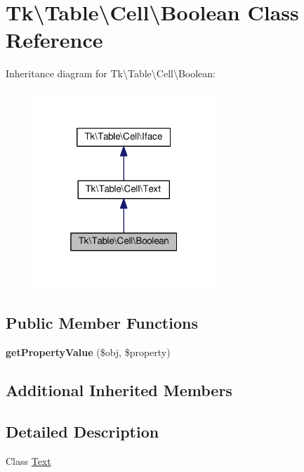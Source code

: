\hypertarget{classTk_1_1Table_1_1Cell_1_1Boolean}{\section{Tk\textbackslash{}Table\textbackslash{}Cell\textbackslash{}Boolean Class Reference}
\label{classTk_1_1Table_1_1Cell_1_1Boolean}
}


Inheritance diagram for Tk\textbackslash{}Table\textbackslash{}Cell\textbackslash{}Boolean\+:\nopagebreak
\begin{figure}[H]
\begin{center}
\leavevmode
\includegraphics[width=193pt]{classTk_1_1Table_1_1Cell_1_1Boolean__inherit__graph}
\end{center}
\end{figure}
\subsection*{Public Member Functions}
\begin{DoxyCompactItemize}
\item 
\hypertarget{classTk_1_1Table_1_1Cell_1_1Boolean_a05048e18d4f23c81284208bf3342cc5b}{{\bfseries get\+Property\+Value} (\$obj, \$property)}\label{classTk_1_1Table_1_1Cell_1_1Boolean_a05048e18d4f23c81284208bf3342cc5b}

\end{DoxyCompactItemize}
\subsection*{Additional Inherited Members}


\subsection{Detailed Description}
Class \hyperlink{classTk_1_1Table_1_1Cell_1_1Text}{Text}

